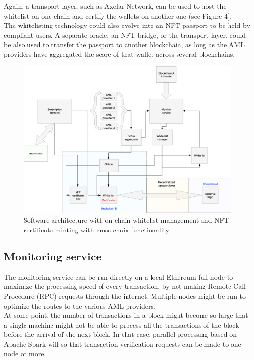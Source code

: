 ﻿\documentclass[a4paper]{article}
\begin{document}
Again, a transport layer, such as Axelar Network, can be used to host the whitelist on one chain and certify the wallets on another one (see Figure 4). \\

The whitelisting technology could also evolve into an NFT passport to be held by compliant users. A separate oracle, an NFT bridge, or the transport layer, could be also used to transfer the passport to another blockchain, as long as the AML providers have aggregated the score of that wallet across several blockchains. \\
  
\begin{figure}[!h]
\centering
\includegraphics[scale=0.35]{architecture_v2_crosschain_trim.png}
\caption{Software architecture with on-chain whitelist management and NFT certificate minting with cross-chain functionality}
\label{onchain}
\end{figure}


\subsection{Monitoring service}
The monitoring service can be run directly on a local Ethereum full node to maximize the processing speed of every transaction, by not making Remote Call Procedure (RPC) requests through the internet. Multiple nodes might be run to optimize the routes to the various AML providers. \\

At some point, the number of transactions in a block might become so large that a single machine might not be able to process all the transactions of the block before the arrival of the next block. In that case, parallel processing based on Apache Spark will so that transaction verification requests can be made to one node or more. \\
\end{document}
